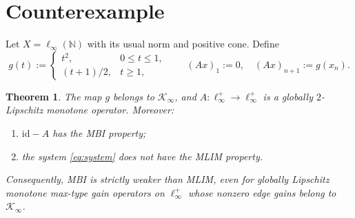 \documentclass[11pt,a4paper]{article}
\newtheorem{theorem}{Theorem}
\newcommand{\N}{\mathbb N}
\newcommand{\Kinf}{\mathcal K_\infty}
\newcommand{\id}{\mathrm{id}}
\begin{document}
\section{Counterexample}

Let $X=\ell_\infty(\N)$ with its usual norm and positive cone.  Define
\begin{equation}\label{eq:g}
 g(t):=
 \begin{cases}
 t^2,&0\leq t\leq1,\\
 (t+1)/2,&t\geq1,
 \end{cases}
\qquad
 (Ax)_1:=0,\quad (Ax)_{n+1}:=g(x_n).
\end{equation}

\begin{theorem}\label{thm:main}
The map $g$ belongs to $\Kinf$, and
$A:\ell_\infty^+\to\ell_\infty^+$ is a globally $2$-Lipschitz monotone
operator.  Moreover:
\begin{enumerate}[label=(\roman*)]
\item $\id-A$ has the MBI property;
\item the system \eqref{eq:system} does not have the MLIM property.
\end{enumerate}
Consequently, MBI is strictly weaker than MLIM, even for globally Lipschitz
monotone max-type gain operators on $\ell_\infty^+$ whose nonzero edge gains
belong to $\Kinf$.
\end{theorem}
\end{document}
